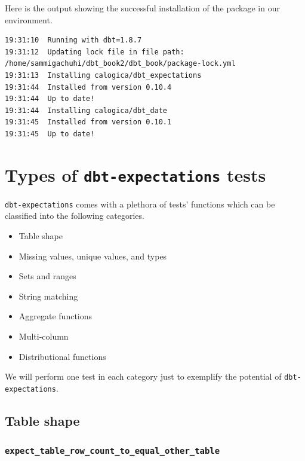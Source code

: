 \documentclass[
]{book}
\providecommand{\tightlist}{%
  \setlength{\itemsep}{0pt}\setlength{\parskip}{0pt}}
\begin{document}
Here is the output showing the successful installation of the package in our environment.

\begin{verbatim}
19:31:10  Running with dbt=1.8.7
19:31:12  Updating lock file in file path: /home/sammigachuhi/dbt_book2/dbt_book/package-lock.yml
19:31:13  Installing calogica/dbt_expectations
19:31:44  Installed from version 0.10.4
19:31:44  Up to date!
19:31:44  Installing calogica/dbt_date
19:31:45  Installed from version 0.10.1
19:31:45  Up to date!
\end{verbatim}

\hypertarget{types-of-dbt-expectations-tests}{%
\section{\texorpdfstring{Types of \texttt{dbt-expectations} tests}{Types of dbt-expectations tests}}\label{types-of-dbt-expectations-tests}}

\texttt{dbt-expectations} comes with a plethora of tests' functions which can be classified into the following categories.

\begin{itemize}
\tightlist
\item
  Table shape
\item
  Missing values, unique values, and types
\item
  Sets and ranges
\item
  String matching
\item
  Aggregate functions
\item
  Multi-column
\item
  Distributional functions
\end{itemize}

We will perform one test in each category just to exemplify the potential of \texttt{dbt-expectations}.

\hypertarget{table-shape}{%
\subsection{Table shape}\label{table-shape}}

\hypertarget{expect_table_row_count_to_equal_other_table}{%
\subsubsection{\texorpdfstring{\texttt{expect\_table\_row\_count\_to\_equal\_other\_table}}{expect\_table\_row\_count\_to\_equal\_other\_table}}\label{expect_table_row_count_to_equal_other_table}}
\end{document}
